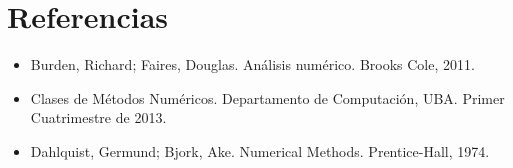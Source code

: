 \section{Referencias}

\begin{itemize}
  \item \nocite {Burden} Burden, Richard; Faires, Douglas. An\'alisis 
num\'erico. Brooks Cole, 2011.
  \item \nocite {MN} Clases de M\'etodos Num\'ericos. Departamento de 
Computaci\'on, UBA. Primer Cuatrimestre de 2013.
  \item \nocite {Dahlquist} Dahlquist, Germund; Bjork, Ake. Numerical Methods. 
Prentice-Hall, 1974.
\end{itemize}
